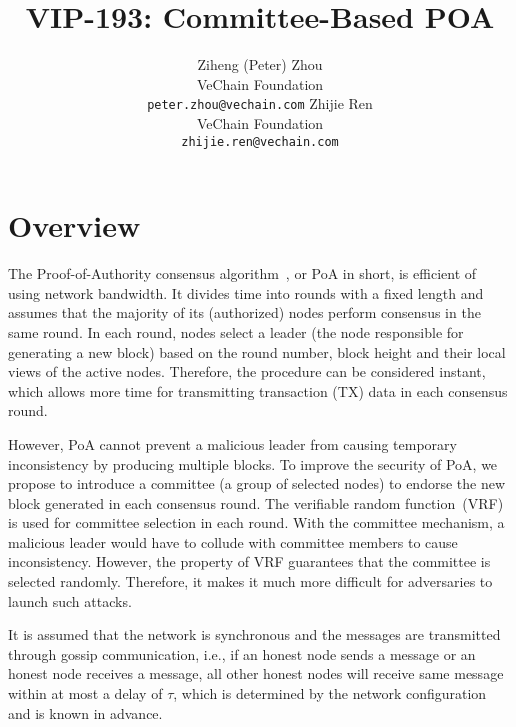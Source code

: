 \documentclass{article}
\title{VIP-193: Committee-Based POA}
\author{
  Ziheng (Peter) Zhou \vspace{1ex}\\
  VeChain Foundation \\
  \texttt{peter.zhou@vechain.com}
  \And
  Zhijie Ren \vspace{1ex} \\
  VeChain Foundation \\
  \texttt{zhijie.ren@vechain.com}
}
\date{\vspace{-5ex}}
\begin{document}
\maketitle




\section{Overview}
The Proof-of-Authority consensus algorithm~\cite{VWP18}, or PoA in short, is efficient of using network bandwidth. It divides time into rounds with a fixed length and assumes that the majority of its (authorized) nodes perform consensus in the same round. In each round, nodes select a leader (the node responsible for generating a new block) based on the round number, block height and their local views of the active nodes. Therefore, the procedure can be considered instant, which allows more time for transmitting transaction (TX) data in each consensus round.

However, PoA cannot prevent a malicious leader from causing temporary inconsistency by producing multiple blocks. To improve the security of PoA, we propose to introduce a committee (a group of selected nodes) to endorse the new block generated in each consensus round. The verifiable random function~(VRF)~\cite{PapEtAl99} is used for committee selection in each round. With the committee mechanism, a malicious leader would have to collude with committee members to cause inconsistency. However, the property of VRF guarantees that the committee is selected randomly. Therefore, it makes it much more difficult for adversaries to launch such attacks.

It is assumed that the network is synchronous and the messages are transmitted through gossip communication, i.e., if an honest node sends a message or an honest node receives a message, all other honest nodes will receive same message within at most a delay of $\tau$, which is determined by the network configuration and is known in advance.
\end{document}
